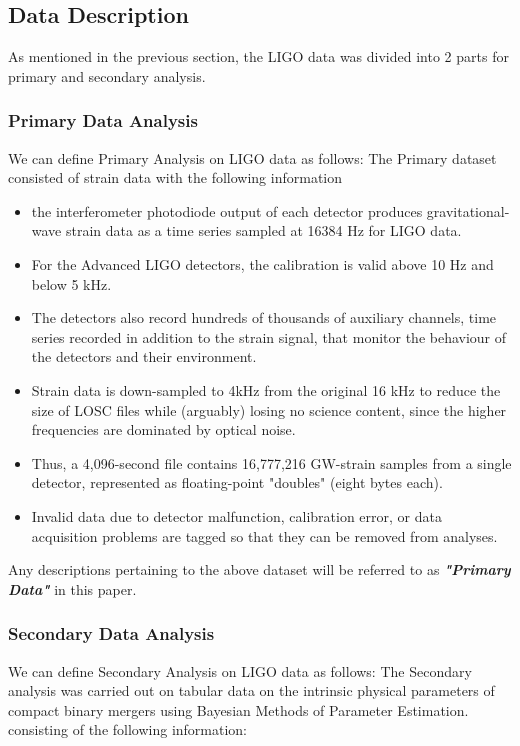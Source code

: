     \subsection{Data Description}
    As mentioned in the previous section, the LIGO data was divided into 2 parts for primary and secondary analysis.

    \subsubsection{Primary Data Analysis}

    We can define Primary Analysis on LIGO data as follows:
    The Primary dataset consisted of strain data with the following information

    \begin{itemize}
        \item the interferometer photodiode output of each detector produces gravitational-wave strain data as a time series sampled at 16384 Hz for LIGO data.
        \item For the Advanced LIGO detectors, the calibration is valid above 10 Hz and below 5 kHz.
        \item The detectors also record hundreds of thousands of auxiliary channels, time series recorded in addition to the strain signal, that monitor the behaviour of the detectors and their environment.
        \item Strain data is down-sampled to 4kHz from the original 16 kHz to reduce the size of LOSC files while (arguably) losing no science content, since the higher frequencies are dominated by
        optical noise.
        \item Thus, a 4,096-second file contains 16,777,216 GW-strain samples from a single
        detector, represented as floating-point "doubles" (eight bytes each).
        \item Invalid data due to detector malfunction, calibration error, or data acquisition problems are
    tagged so that they can be removed from analyses.

    \end{itemize}

    Any descriptions pertaining to the above dataset will be referred to as \textbf{\textit{"Primary Data"}} in this paper.

    \subsubsection{Secondary Data Analysis}
    We can define Secondary Analysis on LIGO data as follows:
    The Secondary analysis was carried out on tabular data  on the intrinsic physical parameters of compact binary mergers using Bayesian Methods of Parameter Estimation. \cite{00.7_LIGOBayesianAnalysis} \cite{00.6_LIGOAnalysisPipeline} \cite{24.4_CompactBinaryParameterEstimates} \cite{24.5_GWParameterEsitmation} \cite{24.6_LIGOParameterEstimates} consisting of the following information:

